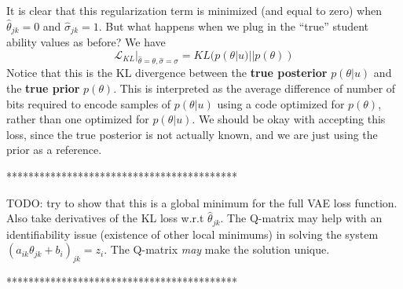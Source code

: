 \documentclass[letterpaper]{article}
\theoremstyle{definition}
\begin{document}
It is clear that this regularization term is minimized (and equal to zero) when $\hat \theta_{jk} = 0$ and $\hat \sigma_{jk} = 1$. But what happens when we plug in the ``true'' student ability values as before? We have
\begin{equation}
  \mathcal{L}_{KL} \Big|_{\hat \theta = \theta, \hat \sigma = \sigma} = KL(p(\theta | u) || p(\theta))
  \label{eq}
\end{equation}
Notice that this is the KL divergence between the \textbf{true posterior} $p(\theta |u)$ and the \textbf{true prior} $p(\theta)$. This is interpreted as the average difference of number of bits required to encode samples of $p(\theta |u)$ using a code optimized for $p(\theta)$, rather than one optimized for $p(\theta | u)$. We should be okay with accepting this loss, since the true posterior is not actually known, and we are just using the prior as a reference.

******************************************

TODO: try to show that this is a global minimum for the full VAE loss function. Also take derivatives of the KL loss w.r.t $\hat \theta_{jk}$. The Q-matrix may help with an identifiability issue (existence of other local minimums) in solving the system $(a_{ik}\theta_{jk} + b_i)_{jk} = z_i$. The Q-matrix \textit{may} make the solution unique.

******************************************
\end{document}
